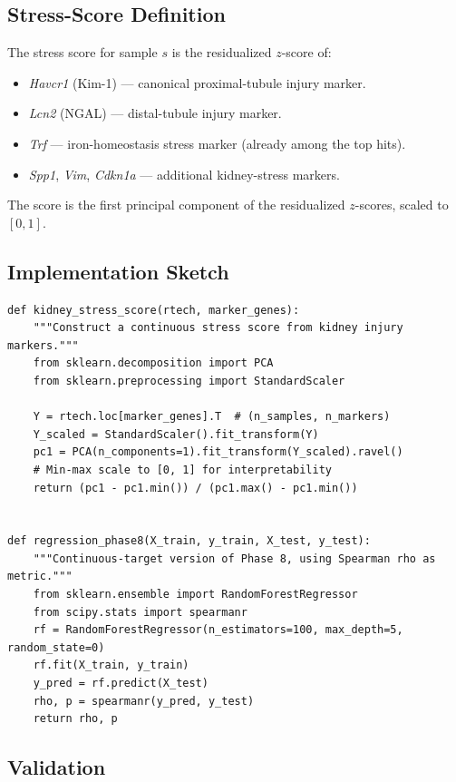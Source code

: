\documentclass[11pt]{article}
\begin{document}
\subsection{Stress-Score Definition}

The stress score for sample $s$ is the residualized $z$-score of:
\begin{itemize}[leftmargin=*]
\item \emph{Havcr1} (Kim-1) --- canonical proximal-tubule injury marker.
\item \emph{Lcn2} (NGAL) --- distal-tubule injury marker.
\item \emph{Trf} --- iron-homeostasis stress marker (already among the top hits).
\item \emph{Spp1}, \emph{Vim}, \emph{Cdkn1a} --- additional kidney-stress markers.
\end{itemize}

The score is the first principal component of the residualized $z$-scores, scaled to $[0, 1]$.

\subsection{Implementation Sketch}

\begin{lstlisting}[style=pythonstyle,caption={Continuous stress-score regression target.}]
def kidney_stress_score(rtech, marker_genes):
    """Construct a continuous stress score from kidney injury markers."""
    from sklearn.decomposition import PCA
    from sklearn.preprocessing import StandardScaler

    Y = rtech.loc[marker_genes].T  # (n_samples, n_markers)
    Y_scaled = StandardScaler().fit_transform(Y)
    pc1 = PCA(n_components=1).fit_transform(Y_scaled).ravel()
    # Min-max scale to [0, 1] for interpretability
    return (pc1 - pc1.min()) / (pc1.max() - pc1.min())


def regression_phase8(X_train, y_train, X_test, y_test):
    """Continuous-target version of Phase 8, using Spearman rho as metric."""
    from sklearn.ensemble import RandomForestRegressor
    from scipy.stats import spearmanr
    rf = RandomForestRegressor(n_estimators=100, max_depth=5, random_state=0)
    rf.fit(X_train, y_train)
    y_pred = rf.predict(X_test)
    rho, p = spearmanr(y_pred, y_test)
    return rho, p
\end{lstlisting}

\subsection{Validation}
\end{document}
